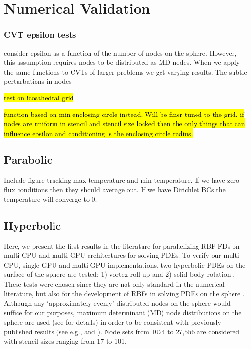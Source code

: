 \documentclass{report}
\begin{document}
\fi

\chapter{Numerical Validation} 

\label{chap:explicit_implicit_pdes}



\subsection{CVT epsilon tests}

\cite{FlyerLehto11} consider epsilon as a function of the number of nodes on the sphere. However, this assumption requires nodes to be distributed as MD nodes. When we apply the same functions to CVTs of larger problems we get varying results. The subtle perturbations in nodes 

\hl{test on icosahedral grid}

\hl{function based on min enclosing circle instead. Will be finer tuned to the grid. if nodes are uniform in stencil and stencil size locked then the only things that can influence epsilon and conditioning is the enclosing circle radius.}


\section{Parabolic} 

Include figure tracking max temperature and min temperature. If we have zero flux conditions then they should average out. If we have Dirichlet BCs the temperature will converge to 0. 



\section{Hyperbolic} 

Here, we present the first results in the literature for parallelizing RBF-FDs on multi-CPU and multi-GPU architectures for solving PDEs. 
 To verify our multi-CPU, single GPU and multi-GPU implementations, two hyperbolic PDEs on the surface of the sphere are tested: 1) vortex roll-up \cite{NairTransport05, NairJablonowski08} and 2) solid body rotation \cite{JakobChien1995}. These tests were chosen since they are not only standard in the numerical literature, but also
for the development of RBFs in solving PDEs on the sphere \cite{FlyerWright07, Fornberg2008, FlyerLehto10, Fornberg2011a}. Although any `approximately evenly' distributed nodes on the sphere would suffice for our purposes, maximum determinant (MD) node distributions on the sphere are used (see \cite{Sloan2003} for details) in order to be consistent with previously published results (see e.g., \cite{FlyerWright07} and \cite{FornbergLehto11}). Node sets from 1024 to 27,556 are considered with stencil sizes ranging from 17 to 101.
\end{document}

